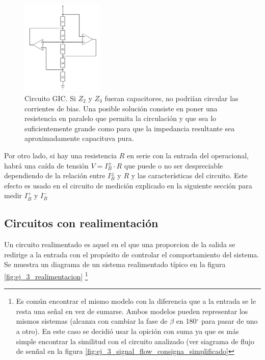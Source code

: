 \documentclass[../../main.tex]{subfiles}
\begin{document}
\begin{figure}[htb] %
	\centering
	\includegraphics[width=0.35\textwidth]{imagenes/gic.png}
	\caption[Capacitores en un GIC]{Circuito GIC. Si $Z_2$ y $Z_3$ fueran capacitores, no podri\'ian circular las corrientes de bias. Una posible soluci\'on consiste en poner una resistencia en paralelo que permita la circulaci\'on y que sea lo suficientemente grande como para que la impedancia resultante sea aproximadamente capacituva pura.}
	\label{fig:ej_3_GIC}
\end{figure}


Por otro lado, si hay una resistencia $R$ en serie con la entrada del operacional, habr\'a una ca\'ida de tensi\'on $V=I_B^\pm\cdot R$ que puede o no ser despreciable dependiendo de la relaci\'on entre $I_B^\pm$ y $R$ y las caracter\'isticas del circuito. Este efecto es usado en el circuito de medici\'on explicado en la siguiente secci\'on para medir $I_B^+$ y $I_B^-$








\subsection{Circuitos con realimentaci\'on}	\label{ssec:realimentacion}

Un circuito realimentado es aquel en el que una proporcion de la salida se redirige a la entrada con el prop\'osito de controlar el comportamiento del sistema. Se  muestra un diagrama de un sistema realimentado t\'ipico en la figura \ref{fig:ej_3_realimentacion}
\footnote{Es com\'un encontrar el mismo modelo con la diferencia que a la entrada se le resta una se\~nal en vez de sumarse. Ambos modelos pueden representar los mismos sistemas (alcanza con cambiar la fase de $\beta$ en 180$^\circ$ para pasar de uno a otro). En este caso se decidi\'o usar la opici\'on con suma ya que es m\'as simple encontrar la similitud con el circuito analizado (ver siagrama de flujo de sen\~nal en la figura \ref{fig:ej_3_signal_flow_consigna_simplificado}}
\end{document}
